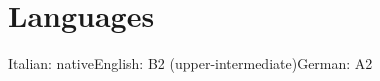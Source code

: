 \section{Languages}
Italian: native\enspace\textbar\enspace English: B2 (upper-intermediate)\enspace\textbar\enspace German: A2

